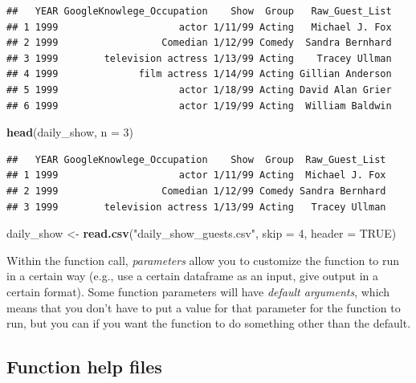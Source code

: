 \documentclass[]{book}
\makeatletter
\newenvironment{Shaded}{\begin{snugshade}}{\end{snugshade}}
\newcommand{\KeywordTok}[1]{\textcolor[rgb]{0.13,0.29,0.53}{\textbf{#1}}}
\newcommand{\DataTypeTok}[1]{\textcolor[rgb]{0.13,0.29,0.53}{#1}}
\newcommand{\DecValTok}[1]{\textcolor[rgb]{0.00,0.00,0.81}{#1}}
\newcommand{\StringTok}[1]{\textcolor[rgb]{0.31,0.60,0.02}{#1}}
\newcommand{\OtherTok}[1]{\textcolor[rgb]{0.56,0.35,0.01}{#1}}
\newcommand{\NormalTok}[1]{#1}
\newenvironment{kframe}{%
\medskip{}
\setlength{\fboxsep}{.8em}
 \def\at@end@of@kframe{}%
 \ifinner\ifhmode%
  \def\at@end@of@kframe{\end{minipage}}%
  \begin{minipage}{\columnwidth}%
 \fi\fi%
 \def\FrameCommand##1{\hskip\@totalleftmargin \hskip-\fboxsep
 \colorbox{shadecolor}{##1}\hskip-\fboxsep
     \hskip-\linewidth \hskip-\@totalleftmargin \hskip\columnwidth}%
 \MakeFramed {\advance\hsize-\width
   \@totalleftmargin\z@ \linewidth\hsize
   \@setminipage}}%
 {\par\unskip\endMakeFramed%
 \at@end@of@kframe}
\renewenvironment{Shaded}{\begin{kframe}}{\end{kframe}}
\theoremstyle{definition}
\theoremstyle{definition}
\theoremstyle{definition}
\theoremstyle{remark}
\makeatother
\begin{document}
\begin{verbatim}
##   YEAR GoogleKnowlege_Occupation    Show  Group   Raw_Guest_List
## 1 1999                     actor 1/11/99 Acting   Michael J. Fox
## 2 1999                  Comedian 1/12/99 Comedy  Sandra Bernhard
## 3 1999        television actress 1/13/99 Acting    Tracey Ullman
## 4 1999              film actress 1/14/99 Acting Gillian Anderson
## 5 1999                     actor 1/18/99 Acting David Alan Grier
## 6 1999                     actor 1/19/99 Acting  William Baldwin
\end{verbatim}

\begin{Shaded}
\begin{Highlighting}[]
\KeywordTok{head}\NormalTok{(daily_show, }\DataTypeTok{n =} \DecValTok{3}\NormalTok{)}
\end{Highlighting}
\end{Shaded}

\begin{verbatim}
##   YEAR GoogleKnowlege_Occupation    Show  Group  Raw_Guest_List
## 1 1999                     actor 1/11/99 Acting  Michael J. Fox
## 2 1999                  Comedian 1/12/99 Comedy Sandra Bernhard
## 3 1999        television actress 1/13/99 Acting   Tracey Ullman
\end{verbatim}

\begin{Shaded}
\begin{Highlighting}[]
\NormalTok{daily_show <-}\StringTok{ }\KeywordTok{read.csv}\NormalTok{(}\StringTok{"daily_show_guests.csv"}\NormalTok{,}
                    \DataTypeTok{skip =} \DecValTok{4}\NormalTok{,}
                    \DataTypeTok{header =} \OtherTok{TRUE}\NormalTok{)}
\end{Highlighting}
\end{Shaded}

Within the function call, \emph{parameters} allow you to customize the
function to run in a certain way (e.g., use a certain dataframe as an
input, give output in a certain format). Some function parameters will
have \emph{default arguments}, which means that you don't have to put a
value for that parameter for the function to run, but you can if you
want the function to do something other than the default.

\subsection{Function help files}\label{function-help-files}
\end{document}
